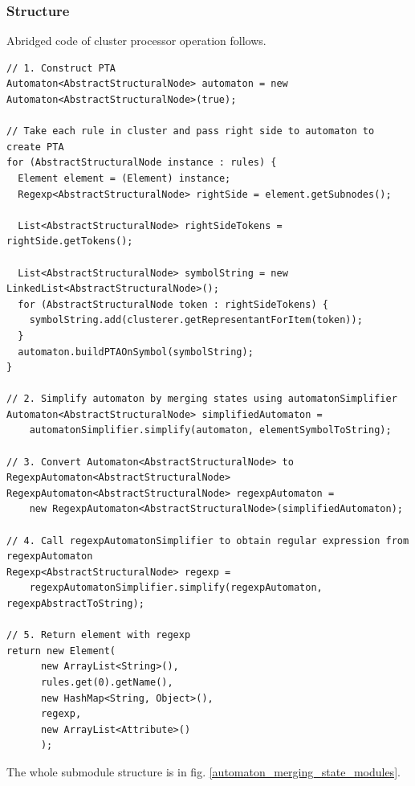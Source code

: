 \documentclass[a4paper,10pt,oneside]{article}
\begin{document}
\subsubsection{Structure} \label{section_AutomatonMergingState_structure}
Abridged code of cluster processor operation follows.
\begin{verbatim}
// 1. Construct PTA
Automaton<AbstractStructuralNode> automaton = new Automaton<AbstractStructuralNode>(true);

// Take each rule in cluster and pass right side to automaton to create PTA
for (AbstractStructuralNode instance : rules) {
  Element element = (Element) instance;
  Regexp<AbstractStructuralNode> rightSide = element.getSubnodes();

  List<AbstractStructuralNode> rightSideTokens = rightSide.getTokens();

  List<AbstractStructuralNode> symbolString = new LinkedList<AbstractStructuralNode>();
  for (AbstractStructuralNode token : rightSideTokens) {
    symbolString.add(clusterer.getRepresentantForItem(token));
  }
  automaton.buildPTAOnSymbol(symbolString);
}

// 2. Simplify automaton by merging states using automatonSimplifier
Automaton<AbstractStructuralNode> simplifiedAutomaton =
    automatonSimplifier.simplify(automaton, elementSymbolToString);

// 3. Convert Automaton<AbstractStructuralNode> to RegexpAutomaton<AbstractStructuralNode>
RegexpAutomaton<AbstractStructuralNode> regexpAutomaton =
    new RegexpAutomaton<AbstractStructuralNode>(simplifiedAutomaton);
    
// 4. Call regexpAutomatonSimplifier to obtain regular expression from regexpAutomaton
Regexp<AbstractStructuralNode> regexp =
    regexpAutomatonSimplifier.simplify(regexpAutomaton, regexpAbstractToString);

// 5. Return element with regexp
return new Element(
      new ArrayList<String>(),
      rules.get(0).getName(),
      new HashMap<String, Object>(),
      regexp,
      new ArrayList<Attribute>()
      );
\end{verbatim}
The whole submodule structure is in fig. \ref{automaton_merging_state_modules}.
\end{document}
